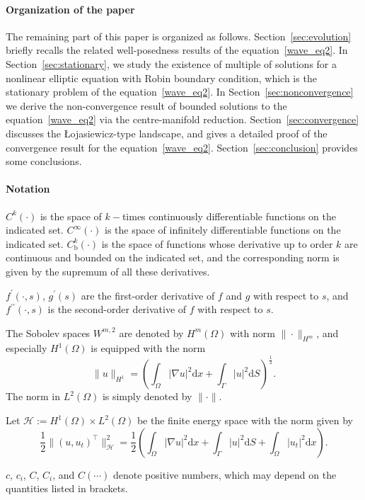\documentclass{elsarticle}
\begin{document}
\paragraph{Organization of the paper}
The remaining part of this paper is organized as follows.
Section~\ref{sec:evolution} briefly recalls the related well-posedness results of the equation~\eqref{wave_eq2}. 
In Section~\ref{sec:stationary}, we study the existence of multiple of solutions for a nonlinear elliptic equation with Robin boundary condition, which is the stationary problem of the equation~\eqref{wave_eq2}. In Section~\ref{sec:nonconvergence} we derive the non-convergence result of bounded solutions to the equation~\eqref{wave_eq2} via the centre-manifold reduction. Section~\ref{sec:convergence} discusses the {\L}ojasiewicz-type landscape, and gives a detailed proof of the convergence result for the equation~\eqref{wave_eq2}. Section~\ref{sec:conclusion} provides some conclusions.

 
\paragraph{Notation}
$C^{k}(\cdot)$ is the space of $k-$times continuously differentiable functions on the indicated set. $C^{\infty}(\cdot)$ is the space of infinitely differentiable functions on the indicated set. $C^k_{\mathrm{b}}(\cdot)$ is the space of functions whose derivative up to order $k$ are continuous and bounded on the indicated set, and the corresponding norm is given by the supremum of all these derivatives.

 $f^{\prime}(\cdot, s)$, $g^{\prime}(s)$ are the first-order derivative of $f$ and $g$ with respect to $s$, and $f^{\prime\prime}(\cdot, s)$ is the second-order derivative of $f$ with respect to $s$. 

The Sobolev spaces $W^{m, 2}$ are denoted by $H^m(\Omega)$ with norm $\|\cdot\|_{H^m}$, and especially $H^1(\Omega)$ is equipped with the norm
\[
	\|u\|_{H^1} = \left(\int_{\Omega}|\nabla u|^2\mathrm{d}x + \int_{\Gamma}|u|^2\mathrm{d}S \right)^{\frac{1}{2}}.
\]
The norm in $L^2(\Omega)$ is simply denoted by $\|\cdot\|$.

Let $\mathcal{H}:=H^{1}(\Omega)\times L^{2}(\Omega)$ be the finite energy space with the norm given by 
\[
	\frac{1}{2}\|(u, u_t)^{\top}\|^2_{\mathcal{H}} = \frac{1}{2}\left(\int_{\Omega}|\nabla u|^2\mathrm{d}x + \int_{\Gamma}|u|^2\mathrm{d}S + \int_{\Omega}|u_t|^2\mathrm{d}x\right).
\]

$c$, $c_i$, $C$, $C_i$, and $C(\cdots)$ denote positive numbers, which may depend on the quantities listed in brackets.
\end{document}
